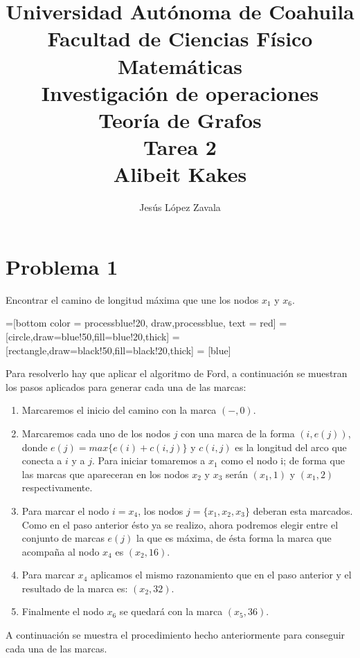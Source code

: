 \documentclass[autocontact]{gaceta}
\title{Universidad Autónoma de Coahuila \\ Facultad de Ciencias Físico Matemáticas
\\ Investigación de operaciones \\ Teoría de Grafos \\ Tarea 2 \\ Alibeit Kakes}
\author{Jesús López Zavala} %
\begin{document}
\maketitle


\section{Problema 1}
    Encontrar el camino de longitud máxima que une los nodos $x_{1}$ y $x_{6}$.
    
    =[bottom color = processblue!20, draw,processblue, text = red]
    =[circle,draw=blue!50,fill=blue!20,thick]
    =[rectangle,draw=black!50,fill=black!20,thick]
    = [blue]
    
    

    Para resolverlo hay que aplicar el algoritmo de Ford, a continuación se muestran los pasos 
    aplicados para generar cada una de las marcas:
    \begin{enumerate}
        \item Marcaremos el inicio del camino con la marca $(-,0).$
        \item Marcaremos cada uno de los nodos $j$  con una marca de la forma $(i, e(j))$, donde 
        $ e(j) = max \{e(i) + c(i,j)\}$ y $c(i, j)$ es la longitud del arco que conecta a $i$ y a $j$.
            Para iniciar tomaremos a $x_1$ como el nodo i; de forma que 
            las marcas que apareceran en los nodos $x_2$ y $x_3$ serán $(x_1, 1)$ y $(x_1, 2)$ 
            respectivamente.
        \item Para marcar el nodo $i = x_4$, los nodos $j = \{ x_1, x_2, x_3\}$ deberan esta marcados.
            Como en el paso anterior ésto ya se realizo, ahora podremos elegir entre el conjunto de marcas
            $e(j)$ la que es máxima, de ésta forma la marca que acompaña al nodo $x_4$ es $(x_2, 16)$.
        \item Para marcar $x_4$ aplicamos el mismo razonamiento que en el paso anterior y el resultado
        de la marca es: $(x_2, 32)$.
        \item Finalmente el nodo $x_6$ se quedará con la marca $(x_5, 36)$.
    \end{enumerate}
    A continuación se muestra el procedimiento hecho anteriormente para conseguir cada una de las 
    marcas. 
    
\end{document}
